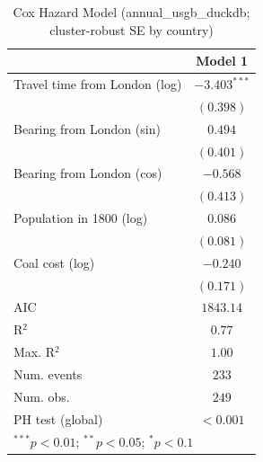 
\begin{table}
\begin{center}
\begin{tabular}{l c}
\hline
 & Model 1 \\
\hline
Travel time from London (log) & $-3.403^{***}$ \\
 & $(0.398)$ \\
Bearing from London (sin) & $0.494$ \\
 & $(0.401)$ \\
Bearing from London (cos) & $-0.568$ \\
 & $(0.413)$ \\
Population in 1800 (log) & $0.086$ \\
 & $(0.081)$ \\
Coal cost (log) & $-0.240$ \\
 & $(0.171)$ \\
\hline
AIC              & $1843.14$ \\
R$^2$            & $0.77$ \\
Max. R$^2$       & $1.00$ \\
Num. events      & $233$ \\
Num. obs.        & $249$ \\
PH test (global) & $<0.001$ \\
\hline
\multicolumn{2}{l}{\scriptsize{$^{***}p<0.01$; $^{**}p<0.05$; $^{*}p<0.1$}}
\end{tabular}
\caption{Cox Hazard Model (annual\_usgb\_duckdb; cluster-robust SE by country)}
\label{tab:cox_serious_annual_usgb_duckdb}
\end{center}
\end{table}
